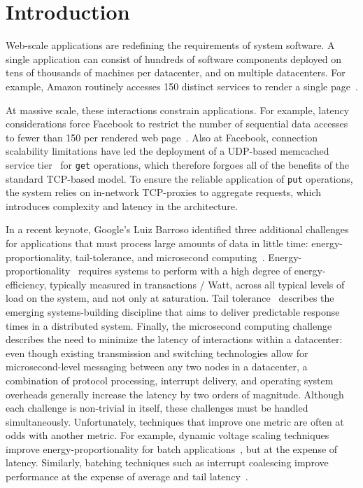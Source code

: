 
\section{Introduction}
\label{sec:intro}



Web-scale applications are redefining the requirements of system
software.  A single application can consist of hundreds of software
components deployed on tens of thousands of machines per datacenter,
and on multiple datacenters.  For example, Amazon routinely accesses
150 distinct services to render a single
page~\cite{DBLP:conf/sosp/DeCandiaHJKLPSVV07}.  

At massive scale, these interactions constrain applications.  For
example, latency considerations force Facebook to restrict the number
of sequential data accesses to fewer than 150 per rendered web
page~\cite{rumble2011s}.  Also at Facebook, connection scalability
limitations have led the deployment of a UDP-based memcached service
tier~\cite{nishtala2013scaling} for \texttt{get} operations, which
therefore forgoes all of the benefits of the standard TCP-based model.
To ensure the reliable application of \texttt{put} operations, the
system relies on in-network TCP-proxies to aggregate requests, which
introduces complexity and latency in the architecture.

In a recent keynote, Google's Luiz Barroso identified three additional challenges
for applications that must process large amounts of data in little
time: energy-proportionality, tail-tolerance, and microsecond
computing~\cite{luiz-isscc}.
Energy-proportionality~\cite{DBLP:journals/computer/BarrosoH07}
requires systems to perform with a high degree of energy-efficiency,
typically measured in transactions / Watt, across all typical levels
of load on the system, and not only at saturation. Tail
tolerance~\cite{DBLP:journals/cacm/DeanB13} describes the emerging
systems-building discipline that aims to deliver predictable response
times in a distributed system.  Finally, the microsecond computing
challenge describes the need to minimize the latency of interactions
within a datacenter: even though existing transmission and switching
technologies allow for microsecond-level messaging between any two
nodes in a datacenter, a combination of protocol processing, interrupt
delivery, and operating system overheads generally increase the
latency by two orders of magnitude.  Although each challenge is
non-trivial in itself, these challenges must be handled
simultaneously.  Unfortunately, techniques that improve one metric are
often at odds with another metric.  For example, dynamic voltage
scaling techniques improve energy-proportionality for batch
applications~\cite{DBLP:conf/asplos/DelimitrouK14}, but at the
expense of latency.  Similarly, batching techniques such as interrupt
coalescing improve performance at the expense of average and tail
latency~\cite{missing}.

